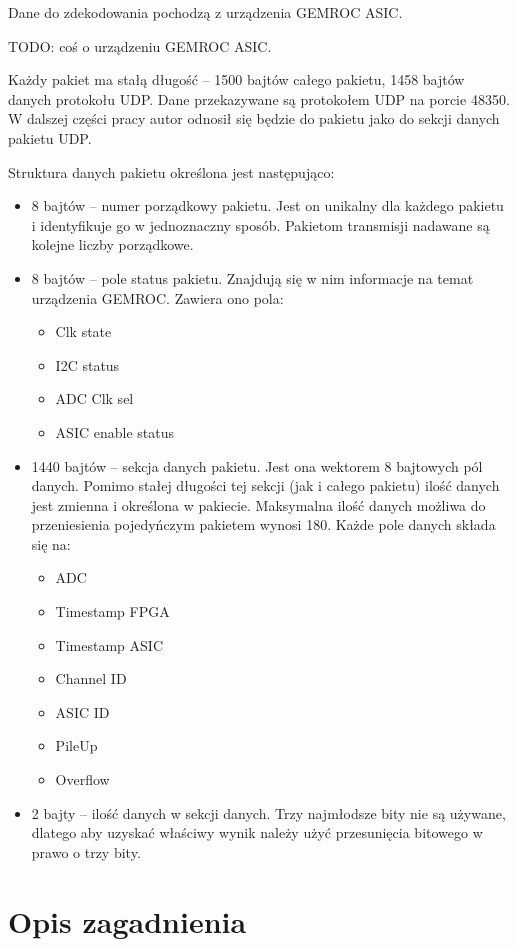 \documentclass[a4paper, 12pt, twoside, openright]{article}
\begin{document}
	Dane do zdekodowania pochodzą z urządzenia GEMROC ASIC.

	TODO: coś o urządzeniu GEMROC ASIC.

	Każdy pakiet ma stałą długość -- 1500 bajtów całego pakietu, 1458 bajtów danych protokołu UDP.
	Dane przekazywane są protokołem UDP na porcie 48350.
	W dalszej części pracy autor odnosił się będzie do pakietu jako do sekcji danych pakietu UDP.

	Struktura danych pakietu określona jest następująco:
	\begin{itemize}
		\item 8 bajtów -- numer porządkowy pakietu. Jest on unikalny dla każdego pakietu i identyfikuje go w jednoznaczny sposób.
			Pakietom transmisji nadawane są kolejne liczby porządkowe.
		\item 8 bajtów -- pole status pakietu. Znajdują się w nim informacje na temat urządzenia GEMROC. Zawiera ono pola:
			\begin{itemize}
				\item Clk state
				\item I2C status
				\item ADC Clk sel
				\item ASIC enable status
			\end{itemize}
		\item 1440 bajtów -- sekcja danych pakietu. Jest ona wektorem 8 bajtowych pól danych. Pomimo stałej długości tej sekcji
			(jak i całego pakietu) ilość danych jest zmienna i określona w pakiecie. Maksymalna ilość danych możliwa do przeniesienia
			pojedyńczym pakietem wynosi 180. Każde pole danych składa się na:
			\begin{itemize}
				\item ADC
				\item Timestamp FPGA
				\item Timestamp ASIC
				\item Channel ID
				\item ASIC ID
				\item PileUp
				\item Overflow
			\end{itemize}
		\item 2 bajty -- ilość danych w sekcji danych. Trzy najmłodsze bity nie są używane, dlatego aby uzyskać właściwy wynik
			należy użyć przesunięcia bitowego w prawo o trzy bity.
	\end{itemize}


\newpage
\section{Opis zagadnienia}
\end{document}
